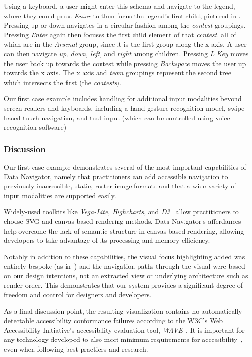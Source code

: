 \documentclass[12pt]{cmuthesis}
\begin{document}
Using a keyboard, a user might enter this schema and navigate to the legend, where they could press \textit{Enter} to then focus the legend's first child, pictured in . Pressing up or down navigates in a circular fashion among the \textit{contest} groupings. Pressing \textit{Enter} again then focuses the first child element of that \textit{contest}, all of which are in the \textit{Arsenal} group, since it is the first group along the x axis. A user can then navigate \textit{up, down, left,} and \textit{right} among children. Pressing \textit{L Key} moves the user back up towards the contest while pressing \textit{Backspace} moves the user up towards the x axis. The x axis and \textit{team} groupings represent the second tree which intersects the first (the \textit{contests}).

Our first case example includes handling for additional input modalities beyond screen readers and keyboards, including a hand gesture recognition model, swipe-based touch navigation, and text input (which can be controlled using voice recognition software).

\subsubsection{Discussion}
Our first case example demonstrates several of the most important capabilities of Data Navigator, namely that practitioners can add accessible navigation to previously inaccessible, static, raster image formats and that a wide variety of input modalities are supported easily.

Widely-used toolkits like \textit{Vega-Lite}, \textit{Highcharts}, and \textit{D3}~\cite{Bostock2011D3} allow practitioners to choose SVG and canvas-based rendering methods. Data Navigator's affordances help overcome the lack of semantic structure in canvas-based rendering, allowing developers to take advantage of its processing and memory efficiency.

Notably in addition to these capabilities, the visual focus highlighting added was entirely bespoke (as in~) and the navigation paths through the visual were based on our design intentions, not an extracted view or underlying architecture such as render order. This demonstrates that our system provides a significant degree of freedom and control for designers and developers.

As a final discussion point, the resulting visualization contains no automatically detectable accessibility conformance failures according to the W3C's Web Accessibility Initiative's accessibility evaluation tool, \textit{WAVE}~\cite{WebAIMWAVE}. It is important for any technology developed to also meet minimum requirements for accessibility~\cite{Lundgard2019Sociotechnical,Lundgard2022Accessible,Zong2022Rich,Elavsky2022Chartability}, even when following best-practices and research.
\end{document}
